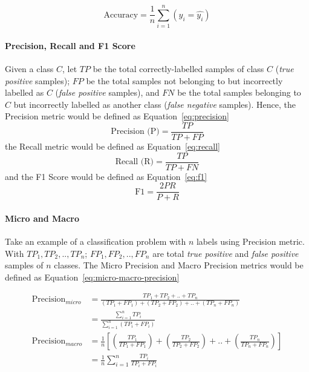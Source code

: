 \documentclass[pdflatex,sn-mathphys]{sn-jnl}%
\theoremstyle{thmstyleone}%
\theoremstyle{thmstyletwo}%
\theoremstyle{thmstylethree}%
\begin{document}
\begin{equation}\label{eq:accuracy}
\text{Accuracy} = \frac{1}{n}\displaystyle\sum_{i = 1}^n (y_i = \hat{y_i})
\end{equation}

\paragraph{Precision, Recall and F1 Score}
Given a class $C$, let $TP$ be the total correctly-labelled samples of class $C$ (\textit{true positive} samples); $FP$ be the total samples not belonging to but incorrectly labelled as $C$ (\textit{false positive} samples), and $FN$ be the total samples belonging to $C$ but incorrectly labelled as another class (\textit{false negative} samples). Hence, the Precision metric would be defined as Equation~\ref{eq:precision}
\begin{equation}\label{eq:precision}
\text{Precision (P)} = \frac{TP}{TP + FP}    
\end{equation}
the Recall metric would be defined as Equation~\ref{eq:recall}
\begin{equation}\label{eq:recall}
\text{Recall (R)} = \frac{TP}{TP + FN}
\end{equation}
and the F1 Score would be defined as Equation~\ref{eq:f1}
\begin{equation}\label{eq:f1}
\text{F1} = \frac{2PR}{P + R}
\end{equation}

\paragraph{Micro and Macro}
Take an example of a classification problem with $n$ labels using Precision metric. With $TP_1, TP_2, .., TP_n$; $FP_1, FP_2, .., FP_n$ are total \textit{true positive} and \textit{false positive} samples of $n$ classes. The Micro Precision and Macro Precision metrics would be defined as Equation~\ref{eq:micro-macro-precision}

\begin{equation}\label{eq:micro-macro-precision}
\begin{aligned}
\text{Precision}_{micro} &= \frac{TP_1 + TP_2 + .. + TP_n}{(TP_1 + FP_1) + (TP_2 + FP_2) + .. + (TP_n + FP_n)} \\
&= \frac{\displaystyle\sum_{i = 1}^n TP_i}{\displaystyle\sum_{i = 1}^n (TP_i + FP_i)} \\
\text{Precision}_{macro} &= \frac{1}{n}\left[\left(\frac{TP_1}{TP_1 + FP_1}\right) + \left(\frac{TP_2}{TP_2 + FP_2}\right) + .. + \left(\frac{TP_n}{TP_n + FP_n}\right)\right] \\
&= \frac{1}{n}\sum_{i = 1}^n \frac{TP_i}{TP_i + FP_i}
\end{aligned}
\end{equation}
\end{document}
